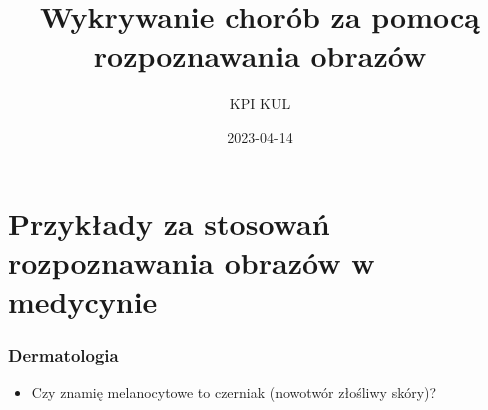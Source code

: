 \documentclass{beamer}
\title{Wykrywanie chorób za pomocą rozpoznawania obrazów}
\author{KPI KUL}
\institute{\url{ai.kul.pl}}
\date{2023-04-14}
\begin{document}
\frame{\titlepage}



\section{Przykłady za stosowań rozpoznawania obrazów w medycynie}

\begin{frame}[fragile]
\frametitle{Dermatologia}
 \begin{itemize}
\item Czy znamię melanocytowe to czerniak (nowotwór złośliwy skóry)?
\end{itemize}
\end{frame}
\end{document}
